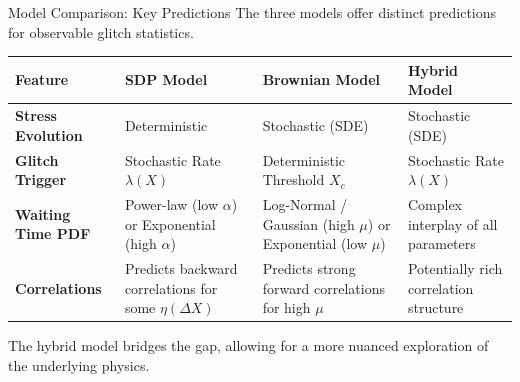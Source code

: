 \begin{frame}{Model Comparison: Key Predictions}
    \centering
    The three models offer distinct predictions for observable glitch statistics.

    \vspace{0.5em}

    \begin{adjustbox}{width=1\textwidth}
    \renewcommand{\arraystretch}{1.5} %
    \begin{tabular}{l >{\centering\arraybackslash}m{3.5cm} >{\centering\arraybackslash}m{3.5cm} >{\centering\arraybackslash}m{3.5cm}}
        \toprule
        \rowcolor{gray!15}
        \textbf{Feature} & \textbf{SDP Model} & \textbf{Brownian Model} & \textbf{Hybrid Model} \\
        \midrule
        \textbf{Stress Evolution} & Deterministic & Stochastic (SDE) & Stochastic (SDE) \\
        \rowcolor{gray!10}
        \textbf{Glitch Trigger} & Stochastic Rate $\lambda(X)$ & Deterministic Threshold $X_c$ & Stochastic Rate $\lambda(X)$ \\
        \textbf{Waiting Time PDF} & Power-law (low $\alpha$) or Exponential (high $\alpha$) & Log-Normal / Gaussian (high $\mu$) or Exponential (low $\mu$) & Complex interplay of all parameters \\
        \rowcolor{gray!10}
        \textbf{Correlations} & Predicts backward correlations for some $\eta(\Delta X)$ & Predicts strong forward correlations for high $\mu$ & Potentially rich correlation structure \\
        \bottomrule
    \end{tabular}
    \end{adjustbox}

    \vspace{0.5em}

    \small The hybrid model bridges the gap, allowing for a more nuanced exploration of the underlying physics.
\end{frame}

